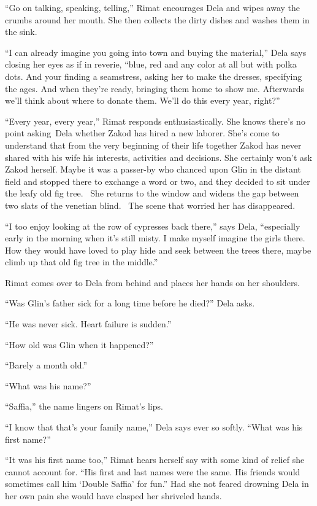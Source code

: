 \documentclass[twoside,11pt,openany]{book}
\begin{document}
``Go on talking, speaking, telling,'' Rimat encourages Dela and wipes away the crumbs around
her mouth. She then collects the dirty dishes and washes them in the sink.

``I can already imagine you going into town and buying the material,'' Dela says closing her
eyes as if in reverie, ``blue, red and any color at all but with polka dots. And your finding a
seamstress, asking her to make the dresses, specifying the ages. And when they're ready, bringing them home to show me.
Afterwards we'll think about where to donate them. We'll do this every year, right?''

``Every year, every year,'' Rimat responds enthusiastically. She knows there's no point
asking~Dela whether Zakod has hired a new laborer. She's come to understand that from the very beginning of their life
together Zakod has never shared with his wife his interests, activities and decisions{. }She certainly
won't{ }ask Zakod herself. Maybe it was a passer-by who chanced upon Glin in the distant field and
stopped there to exchange a word or two, and they decided to sit under the{ }leafy old fig tree.~ She
returns to the window and widens the gap between two slats of the venetian blind. ~The scene that worried her has
disappeared.

``I too enjoy looking at the row of cypresses back there,'' says Dela,
``especially early in the morning when it's still misty. I make myself imagine the girls there. How they
would have loved to play hide and seek between the trees there, maybe climb up that old fig tree in the
middle.''

Rimat comes over to Dela from behind and places her hands on her shoulders.

``Was Glin's father sick for a long time before he died?'' Dela asks.

``He was never sick. Heart failure is sudden.''

``How old was Glin when it happened?''

``Barely a month old.''

``What was his name?''

``Saffia,'' the name lingers on Rimat's lips.

``I know that that's your family name,'' Dela says ever so softly. ``What was his
first name?''

``It was his first name too,'' Rimat hears herself say with some kind of relief she cannot
account for. ``His first and last names were the same. His friends would sometimes call him `Double
Saffia' for fun.''  Had she not feared drowning Dela in her own pain she would have clasped her
shriveled hands.
\end{document}
